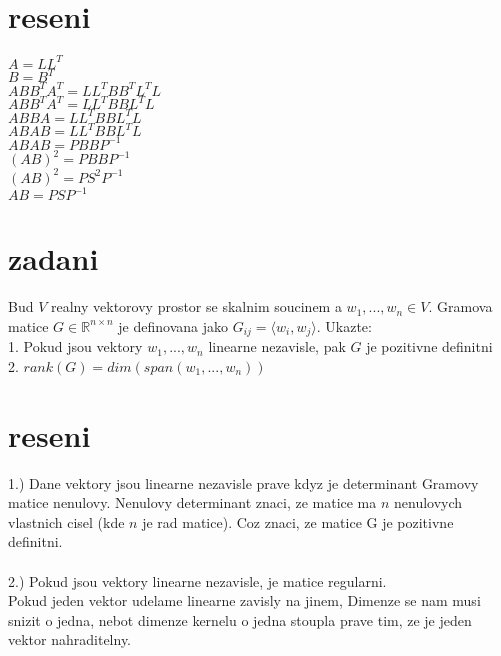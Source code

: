 \documentclass[a4paper]{article}
\begin{document}
\section*{reseni}
$A=LL^T$\\
$B=B^T$\\
$ABB^TA^T=LL^TBB^TL^TL$\\
$ABB^TA^T=LL^TBBL^TL$\\
$ABBA=LL^TBBL^TL$\\
$ABAB=LL^TBBL^TL$\\
$ABAB=PBBP^{-1}$\\
$(AB)^2=PBBP^{-1}$\\
$(AB)^2=PS^2P^{-1}$\\
$AB=PSP^{-1}$\\
















\section*{zadani}
Bud $V$ realny vektorovy prostor se skalnim soucinem a $w_1, ..., w_n \in V$.
Gramova matice $G\in\mathbb{R}^{n\times n}$ je definovana jako $G_{ij}=\langle w_i, w_j\rangle$.
Ukazte:\\
1. Pokud jsou vektory $w_1, ..., w_n$ linearne nezavisle, pak $G$ je pozitivne definitni\\
2. $rank(G) = dim(span(w_1, ..., w_n))$

\section*{reseni}
1.)
Dane vektory jsou linearne nezavisle prave kdyz je determinant
Gramovy matice nenulovy. Nenulovy determinant znaci,
ze matice ma $n$ nenulovych vlastnich cisel (kde $n$ je rad matice).
Coz znaci, ze matice G je pozitivne definitni.\\
\\
2.)
Pokud jsou vektory linearne nezavisle, je matice regularni.\\
Pokud jeden vektor udelame linearne zavisly na jinem,
Dimenze se nam musi snizit o jedna, nebot dimenze kernelu
o jedna stoupla prave tim, ze je jeden vektor nahraditelny.
\end{document}
